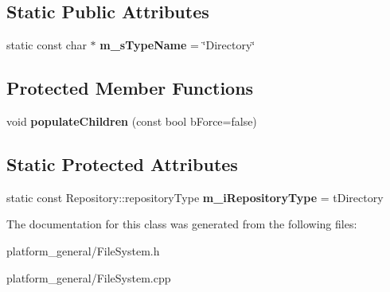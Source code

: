 \subsection*{\-Static \-Public \-Attributes}
\begin{DoxyCompactItemize}
\item 
\hypertarget{classgeneral__server_1_1Directory_a8a5ad1b19c50b88787e8a358c35d2db4}{static const char $\ast$ {\bfseries m\-\_\-s\-Type\-Name} = \char`\"{}\-Directory\char`\"{}}\label{classgeneral__server_1_1Directory_a8a5ad1b19c50b88787e8a358c35d2db4}

\end{DoxyCompactItemize}
\subsection*{\-Protected \-Member \-Functions}
\begin{DoxyCompactItemize}
\item 
\hypertarget{classgeneral__server_1_1Directory_ac46702a41104262e0b9629ef1ef795bc}{void {\bfseries populate\-Children} (const bool b\-Force=false)}\label{classgeneral__server_1_1Directory_ac46702a41104262e0b9629ef1ef795bc}

\end{DoxyCompactItemize}
\subsection*{\-Static \-Protected \-Attributes}
\begin{DoxyCompactItemize}
\item 
\hypertarget{classgeneral__server_1_1Directory_a9ef42c6f10d908af76e7f2468c755362}{static const \*
\-Repository\-::repository\-Type {\bfseries m\-\_\-i\-Repository\-Type} = t\-Directory}\label{classgeneral__server_1_1Directory_a9ef42c6f10d908af76e7f2468c755362}

\end{DoxyCompactItemize}


\-The documentation for this class was generated from the following files\-:\begin{DoxyCompactItemize}
\item 
platform\-\_\-general/\-File\-System.\-h\item 
platform\-\_\-general/\-File\-System.\-cpp\end{DoxyCompactItemize}
